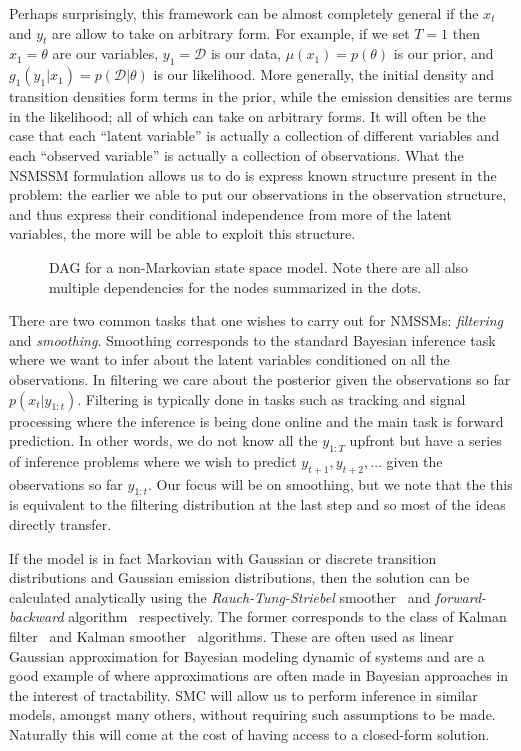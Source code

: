 Perhaps surprisingly, this framework can be almost completely general if the $x_t$ and $y_t$
are allow to take on arbitrary form.  For example, if we set $T=1$ then $x_1=\theta$ are our variables,
$y_1 = \mathcal{D}$ is our data, $\mu(x_1) = p(\theta)$ is our prior, and $g_1(y_1|x_1)=p(\mathcal{D}|\theta)$
is our likelihood.  More generally, the initial density and transition densities form terms in the
prior, while the emission densities are terms in the likelihood; all of which can take on arbitrary forms.
It will often be the case that each ``latent variable'' is actually a collection of different variables and
each ``observed variable'' is actually a collection of observations.
What the NSMSSM formulation allows us to do is express known structure present in the problem: 
the earlier we able to put our observations in the observation structure, and thus express their conditional
independence from more of the latent variables, the more will be able to exploit this structure.

\begin{figure}[t]
	\centering 
	
	\caption{DAG for a non-Markovian state space model.  Note there are all also multiple dependencies
		for the nodes summarized in the dots.
		\label{fig:part:nmssm}}
\end{figure}

There are two common tasks that one wishes to carry out for NMSSMs: \emph{filtering} and
\emph{smoothing}.  Smoothing corresponds to the standard Bayesian inference task where we
want to infer about the latent variables conditioned on all the observations.  In filtering
we care about the posterior given the observations
so far $p(x_t | y_{1:t})$.  Filtering is typically done in tasks such as tracking and signal
processing where the inference is being done online and the main task is forward prediction.
In other words, we do not know all the $y_{1:T}$ upfront but have a series of inference problems
where we wish to predict $y_{t+1},y_{t+2},\dots$ given the observations so far $y_{1:t}$.  Our
focus will be on smoothing, but we note that the this is equivalent to the filtering distribution
at the last step and so most of the ideas directly transfer.

If the model is in fact Markovian with Gaussian or discrete transition distributions and Gaussian
emission distributions, then the solution can be calculated analytically using the \emph{Rauch-Tung-Striebel}
smoother~\citep{rauch1965maximum} and \emph{forward-backward} algorithm~\citep{rabiner1986introduction} respectively.
The former corresponds to the class of Kalman filter~\citep{kalman1960new} and Kalman smoother~\citep{rauch1965maximum}
algorithms.  These are often used as linear Gaussian approximation for Bayesian modeling dynamic of systems and
are a good example of where approximations are often made in Bayesian approaches in the interest of
tractability.  SMC will allow us to perform inference in similar models, amongst many others, without requiring
such assumptions to be made.  Naturally this will come at the cost of having access to a closed-form solution.

